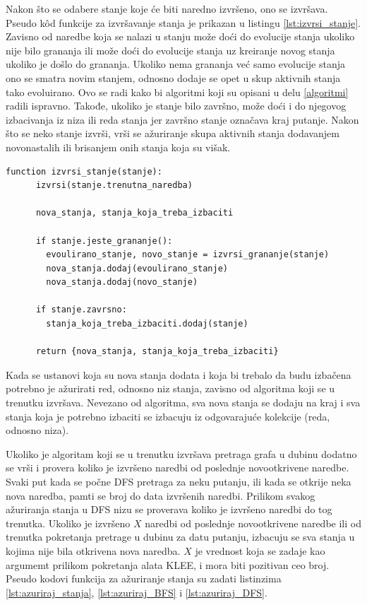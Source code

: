 \documentclass[12pt,oneside]{memoir}
\begin{document}
Nakon što se odabere stanje koje će biti naredno izvršeno, ono se izvršava. Pseudo k\^od funkcije za izvršavanje stanja je prikazan u listingu \ref{lst:izvrsi_stanje}. Zavisno od naredbe koja se nalazi u stanju može doći do evolucije stanja ukoliko nije bilo grananja ili može doći do evolucije stanja uz kreiranje novog stanja ukoliko je došlo do grananja. Ukoliko nema grananja već samo evolucije stanja ono se smatra novim stanjem, odnosno dodaje se opet u skup aktivnih stanja tako evoluirano. Ovo se radi kako bi algoritmi koji su opisani u delu \ref{algoritmi} radili ispravno. Takođe, ukoliko je stanje bilo završno, može doći i do njegovog izbacivanja iz niza ili reda stanja jer završno stanje označava kraj putanje. Nakon što se neko stanje izvrši, vrši se ažuriranje skupa aktivnih stanja dodavanjem novonastalih ili brisanjem onih stanja koja su višak.

    \begin{lstlisting}[caption={Pseudo k\^od funkcije koja izvrsava stanje},captionpos=b,label={lst:izvrsi_stanje}]
    function izvrsi_stanje(stanje):
      izvrsi(stanje.trenutna_naredba)
      
      nova_stanja, stanja_koja_treba_izbaciti
      
      if stanje.jeste_grananje():
        evoulirano_stanje, novo_stanje = izvrsi_grananje(stanje)
        nova_stanja.dodaj(evoulirano_stanje)
        nova_stanja.dodaj(novo_stanje)
      
      if stanje.zavrsno:
        stanja_koja_treba_izbaciti.dodaj(stanje)
        
      return {nova_stanja, stanja_koja_treba_izbaciti}
    \end{lstlisting}
    
Kada se ustanovi koja su nova stanja dodata i koja bi trebalo da budu izbačena potrebno je ažurirati red, odnosno niz stanja, zavisno od algoritma koji se u trenutku izvršava. Nevezano od algoritma, sva nova stanja se dodaju na kraj i sva stanja koja je potrebno izbaciti se izbacuju iz odgovarajuće kolekcije (reda, odnosno niza). 

Ukoliko je algoritam koji se u trenutku izvršava pretraga grafa u dubinu dodatno se vrši i provera koliko je izvršeno naredbi od poslednje novootkrivene naredbe. Svaki put kada se počne DFS pretraga za neku putanju, ili kada se otkrije neka nova naredba, pamti se broj do data izvršenih naredbi. Prilikom svakog ažuriranja stanja u DFS nizu se proverava koliko je izvršeno naredbi do tog trenutka. Ukoliko je izvršeno $X$ naredbi od poslednje novootkrivene naredbe ili od trenutka pokretanja pretrage u dubinu za datu putanju, izbacuju se sva stanja u kojima nije bila otkrivena nova naredba. $X$ je vrednost koja se zadaje kao argumemt prilikom pokretanja alata KLEE, i mora biti pozitivan ceo broj. Pseudo kodovi funkcija za ažuriranje stanja su zadati listinzima \ref{lst:azuriraj_stanja}, \ref{lst:azuriraj_BFS} i \ref{lst:azuriraj_DFS}.
\end{document}
